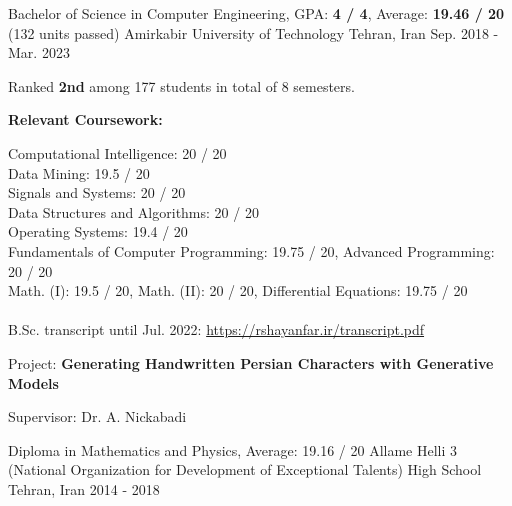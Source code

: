 

\begin{cventries}

  \cventry
    {Bachelor of Science in Computer Engineering, GPA: \textbf{4 / 4}, Average: \textbf{19.46 / 20} (132 units passed)} %
    {Amirkabir University of Technology} %
    {Tehran, Iran} %
    {Sep. 2018 - Mar. 2023} %
    {
      \begin{cvitems}
        \item{Ranked \textbf{2nd} among 177 students in total of 8 semesters.}
        \item{
          \textbf{Relevant Coursework:}
          \smallskip
          \begin{adjustwidth}{4mm}{}
            Computational Intelligence: 20 / 20 \\
	          Data Mining: 19.5 / 20 \\
          	Signals and Systems: 20 / 20 \\
          	Data Structures and Algorithms: 20 / 20 \\
          	Operating Systems: 19.4 / 20 \\
          	Fundamentals of Computer Programming: 19.75 / 20, Advanced Programming: 20 / 20 \\
          	Math. (I): 19.5 / 20, Math. (II): 20 / 20, Differential Equations: 19.75 / 20 \\
            \\[-2mm]
          	\textcolor{awesome-skyblue}{B.Sc. transcript until Jul. 2022: \href{https://rshayanfar.ir/transcript.pdf}{https://rshayanfar.ir/transcript.pdf}}
          	\medskip
          \end{adjustwidth}
        }
        \item{
          Project: \textbf{Generating Handwritten Persian Characters with Generative Models}
        }
        \item{
          Supervisor: Dr. A. Nickabadi
        }
      \end{cvitems}
    }

  \cventry
    {Diploma in Mathematics and Physics, Average: 19.16 / 20} %
    {{\fontsize{9.8pt}{1em}\bodyfont Allame Helli 3 (National Organization for Development of Exceptional Talents) High School}}
    {Tehran, Iran} %
    {2014 - 2018} %
    {}

\end{cventries}
